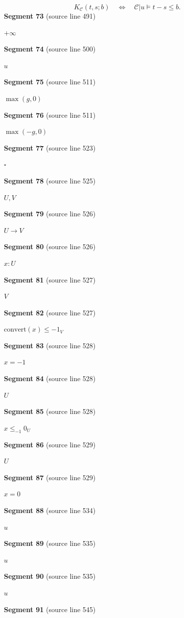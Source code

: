 \documentclass[11pt]{article}
\begin{document}
\[
K_{\mathcal C}(t,s;b)
\quad\Longleftrightarrow\quad
\mathcal C|u\models t-s\le b.
\tag{8}
\]
\textbf{Segment 73} (source line 491)\par
\( +\infty \)\par
\textbf{Segment 74} (source line 500)\par
\( u \)\par
\textbf{Segment 75} (source line 511)\par
\( \max(g,0) \)\par
\textbf{Segment 76} (source line 511)\par
\( \max(-g,0) \)\par
\textbf{Segment 77} (source line 523)\par
\( \square \)\par
\textbf{Segment 78} (source line 525)\par
\( U,V \)\par
\textbf{Segment 79} (source line 526)\par
\( U\to V \)\par
\textbf{Segment 80} (source line 526)\par
\( x:U \)\par
\textbf{Segment 81} (source line 527)\par
\( V \)\par
\textbf{Segment 82} (source line 527)\par
\( \mathrm{convert}(x)\le-1_V \)\par
\textbf{Segment 83} (source line 528)\par
\( x=-1 \)\par
\textbf{Segment 84} (source line 528)\par
\( U \)\par
\textbf{Segment 85} (source line 528)\par
\( x\le_{-1}0_U \)\par
\textbf{Segment 86} (source line 529)\par
\( U \)\par
\textbf{Segment 87} (source line 529)\par
\( x=0 \)\par
\textbf{Segment 88} (source line 534)\par
\( u \)\par
\textbf{Segment 89} (source line 535)\par
\( u \)\par
\textbf{Segment 90} (source line 535)\par
\( u \)\par
\textbf{Segment 91} (source line 545)\par
\end{document}
